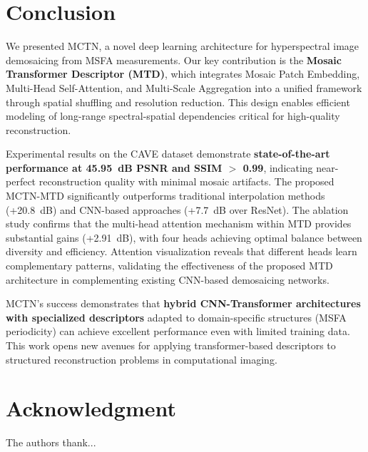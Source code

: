 \documentclass[conference]{IEEEtran}
\begin{document}
\section{Conclusion}

We presented MCTN, a novel deep learning architecture for hyperspectral image demosaicing from MSFA measurements. Our key contribution is the \textbf{Mosaic Transformer Descriptor (MTD)}, which integrates Mosaic Patch Embedding, Multi-Head Self-Attention, and Multi-Scale Aggregation into a unified framework through spatial shuffling and resolution reduction. This design enables efficient modeling of long-range spectral-spatial dependencies critical for high-quality reconstruction.

Experimental results on the CAVE dataset demonstrate \textbf{state-of-the-art performance at 45.95~dB PSNR and SSIM $>$ 0.99}, indicating near-perfect reconstruction quality with minimal mosaic artifacts. The proposed MCTN-MTD significantly outperforms traditional interpolation methods (+20.8~dB) and CNN-based approaches (+7.7~dB over ResNet). The ablation study confirms that the multi-head attention mechanism within MTD provides substantial gains (+2.91~dB), with four heads achieving optimal balance between diversity and efficiency. Attention visualization reveals that different heads learn complementary patterns, validating the effectiveness of the proposed MTD architecture in complementing existing CNN-based demosaicing networks.

MCTN's success demonstrates that \textbf{hybrid CNN-Transformer architectures with specialized descriptors} adapted to domain-specific structures (MSFA periodicity) can achieve excellent performance even with limited training data. This work opens new avenues for applying transformer-based descriptors to structured reconstruction problems in computational imaging.

\section*{Acknowledgment}

The authors thank...
\end{document}
